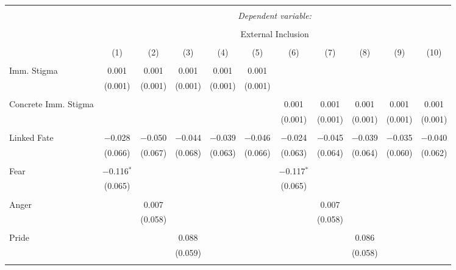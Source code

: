 
\begin{table}[!htbp] \centering 
  \caption{} 
  \label{} 
\begin{tabular}{@{\extracolsep{5pt}}lcccccccccc} 
\\[-1.8ex]\hline 
\hline \\[-1.8ex] 
 & \multicolumn{10}{c}{\textit{Dependent variable:}} \\ 
\cline{2-11} 
\\[-1.8ex] & \multicolumn{10}{c}{External Inclusion} \\ 
\\[-1.8ex] & (1) & (2) & (3) & (4) & (5) & (6) & (7) & (8) & (9) & (10)\\ 
\hline \\[-1.8ex] 
 Imm. Stigma & 0.001 & 0.001 & 0.001 & 0.001 & 0.001 &  &  &  &  &  \\ 
  & (0.001) & (0.001) & (0.001) & (0.001) & (0.001) &  &  &  &  &  \\ 
  & & & & & & & & & & \\ 
 Concrete Imm. Stigma &  &  &  &  &  & 0.001 & 0.001 & 0.001 & 0.001 & 0.001 \\ 
  &  &  &  &  &  & (0.001) & (0.001) & (0.001) & (0.001) & (0.001) \\ 
  & & & & & & & & & & \\ 
 Linked Fate & $-$0.028 & $-$0.050 & $-$0.044 & $-$0.039 & $-$0.046 & $-$0.024 & $-$0.045 & $-$0.039 & $-$0.035 & $-$0.040 \\ 
  & (0.066) & (0.067) & (0.068) & (0.063) & (0.066) & (0.063) & (0.064) & (0.064) & (0.060) & (0.062) \\ 
  & & & & & & & & & & \\ 
 Fear & $-$0.116$^{*}$ &  &  &  &  & $-$0.117$^{*}$ &  &  &  &  \\ 
  & (0.065) &  &  &  &  & (0.065) &  &  &  &  \\ 
  & & & & & & & & & & \\ 
 Anger &  & 0.007 &  &  &  &  & 0.007 &  &  &  \\ 
  &  & (0.058) &  &  &  &  & (0.058) &  &  &  \\ 
  & & & & & & & & & & \\ 
 Pride &  &  & 0.088 &  &  &  &  & 0.086 &  &  \\ 
  &  &  & (0.059) &  &  &  &  & (0.058) &  &  \\ 
  & & & & & & & & & & \\ 

\end{tabular}
\end{table}
